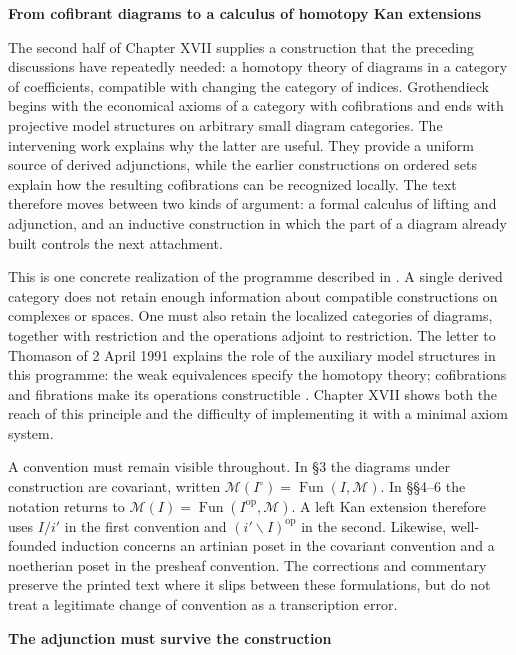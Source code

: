 \noindent\textbf{From cofibrant diagrams to a calculus of homotopy Kan extensions}

The second half of Chapter XVII supplies a construction that the preceding discussions have repeatedly needed: a homotopy theory of diagrams in a category of coefficients, compatible with changing the category of indices. Grothendieck begins with the economical axioms of a category with cofibrations and ends with projective model structures on arbitrary small diagram categories. The intervening work explains why the latter are useful. They provide a uniform source of derived adjunctions, while the earlier constructions on ordered sets explain how the resulting cofibrations can be recognized locally. The text therefore moves between two kinds of argument: a formal calculus of lifting and adjunction, and an inductive construction in which the part of a diagram already built controls the next attachment.

This is one concrete realization of the programme described in \citet[\S69, opening discussion]{Grothendieck1983}. A single derived category does not retain enough information about compatible constructions on complexes or spaces. One must also retain the localized categories of diagrams, together with restriction and the operations adjoint to restriction. The letter to Thomason of 2 April 1991 explains the role of the auxiliary model structures in this programme: the weak equivalences specify the homotopy theory; cofibrations and fibrations make its operations constructible \citep[point~1, printed pp.~3--4]{Grothendieck1991Letter}. Chapter XVII shows both the reach of this principle and the difficulty of implementing it with a minimal axiom system.

A convention must remain visible throughout. In \S3 the diagrams under construction are covariant, written $\mathcal M(I^{\circ})=\operatorname{Fun}(I,\mathcal M)$. In \S\S4--6 the notation returns to $\mathcal M(I)=\operatorname{Fun}(I^{\mathrm{op}},\mathcal M)$. A left Kan extension therefore uses $I/i'$ in the first convention and $(i'\backslash I)^{\mathrm{op}}$ in the second. Likewise, well-founded induction concerns an artinian poset in the covariant convention and a noetherian poset in the presheaf convention. The corrections and commentary preserve the printed text where it slips between these formulations, but do not treat a legitimate change of convention as a transcription error.

\medskip\noindent\textbf{The adjunction must survive the construction}

